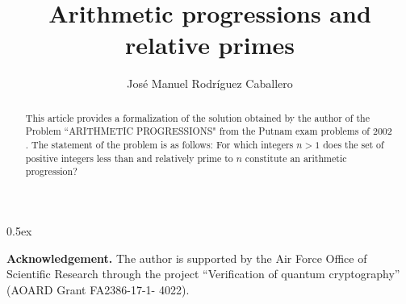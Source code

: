 \documentclass[11pt,a4paper]{article}
\begin{document}
\title{Arithmetic progressions and relative primes}
\author{Jos\'e Manuel Rodr\'iguez Caballero}
\maketitle

\begin{abstract}
This article provides a formalization of the solution obtained by the author of the Problem ``ARITHMETIC PROGRESSIONS" from the 
Putnam exam problems \cite{putnam} of $2002$. The statement of the problem is as follows: For which integers $n>1$ does the set of positive
 integers less than and relatively prime to $n$ constitute an arithmetic progression?
\end{abstract}

\tableofcontents
\newpage
\parindent 0pt\parskip 0.5ex



\begin{flushleft}
{\bf Acknowledgement.} The author is supported by the Air Force Office of Scientific Research through
the project “Verification of quantum cryptography” (AOARD Grant FA2386-17-1-
4022).
\end{flushleft}




\end{document}
